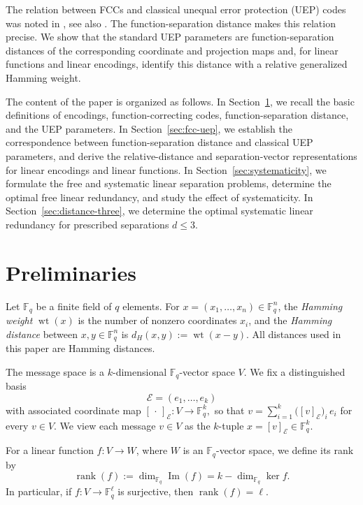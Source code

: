 \documentclass[a4paper,12pt]{article}
\theoremstyle{plain}
\theoremstyle{definition}
\newcommand{\F}{\mathbb F}
\newcommand{\wt}{\operatorname{wt}}
\newcommand{\Imf}{\operatorname{Im}}
\newcommand{\rank}{\operatorname{rank}}
\begin{document}
The relation between FCCs and classical unequal error protection (UEP) codes was noted in \cite[Sec.~I-B]{lenz2023}, see also
\cite{liu2026homogeneous, rajput2026}.
The function-separation distance makes this relation precise. 
We show that the standard UEP parameters are function-separation
distances of the corresponding coordinate and projection maps and, for
linear functions and linear encodings, identify this distance with a
relative generalized Hamming weight.


The content of the paper is organized as follows. 
In Section~\ref{sec:prelim}, we recall the basic definitions of
encodings, function-correcting codes, function-separation distance,
and the UEP parameters. 
In Section~\ref{sec:fcc-uep}, we establish the correspondence between function-separation distance and classical UEP parameters, and derive the relative-distance and separation-vector representations for linear encodings and linear functions. 
In Section~\ref{sec:systematicity}, we formulate
the free and systematic linear separation problems, determine the
optimal free linear redundancy, and study the effect of systematicity.
In Section~\ref{sec:distance-three}, we determine the optimal
systematic linear redundancy for prescribed separations $d\leq3$.

\section{Preliminaries}\label{sec:prelim}

Let $\F_q$ be a finite field of $q$ elements. 
For $x=(x_1,\dots,x_n)\in\F_q^n$, the \emph{Hamming weight} $\wt(x)$ is the number of nonzero coordinates $x_i$, and the \emph{Hamming distance} between $x,y\in\F_q^n$ is $d_H(x,y):=\wt(x-y)$.
All distances used in this paper are Hamming distances.
 

The message space is a $k$-dimensional $\F_q$-vector space $V$.
We fix a distinguished basis
\[
\mathcal E=(e_1,\dots,e_k)
\]
with associated coordinate map
$
[\,\cdot\,]_{\mathcal E}\colon V \rightarrow \F_q^k,
$
so that
$v=\sum_{i=1}^k\bigl([v]_{\mathcal E}\bigr)_i\,e_i$ for every $v\in V$.
We view each message $v\in V$ as the $k$-tuple
$x=[v]_{\mathcal E}\in\F_q^k$.


For a linear function $f\colon V\to W$, where $W$ is an
$\F_q$-vector space, we define its rank by
\[
\rank(f):=\dim_{\F_q}\Imf(f)
         =k-\dim_{\F_q}\ker f.
\]
In particular, if $f\colon V\to\F_q^\ell$ is surjective, then
$\rank(f)=\ell$.
\end{document}
